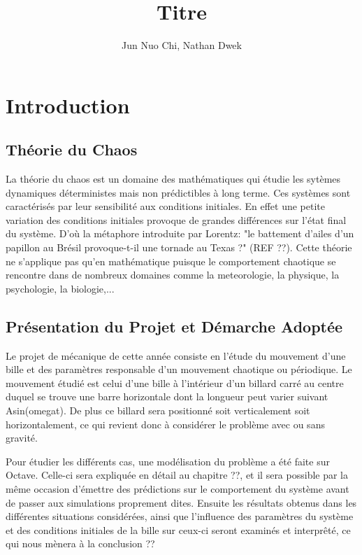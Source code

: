 \documentclass[a4paper]{report}
\title{Titre}
\author{Jun Nuo Chi, Nathan Dwek}
\begin{document}
\maketitle
\tableofcontents
\begin{abstract}

\end{abstract}

\chapter{Introduction}

\section{Théorie du Chaos}
La théorie du chaos est un domaine des mathématiques qui étudie les sytèmes dynamiques déterministes mais non prédictibles à long terme. Ces systèmes sont caractérisés par leur sensibilité aux conditions initiales. En effet une petite variation des conditions initiales provoque de grandes différences sur l'état final du système. D'où la métaphore introduite par Lorentz: "le battement d'ailes d'un papillon au Brésil provoque-t-il une tornade au Texas ?" (REF ??). Cette théorie ne s'applique pas qu'en mathématique puisque le comportement chaotique se rencontre dans de nombreux domaines comme la meteorologie, la physique, la psychologie, la biologie,...

\section{Présentation du Projet et Démarche Adoptée}
Le projet de mécanique de cette année consiste en l'étude du mouvement d'une bille et des paramètres responsable d'un mouvement chaotique ou périodique. Le mouvement étudié est celui d'une bille à l'intérieur d'un billard carré  au centre duquel se  trouve une barre horizontale dont la longueur peut varier suivant Asin(omegat). De plus ce billard sera positionné soit verticalement soit horizontalement, ce qui revient donc à considérer le problème avec ou sans gravité.

Pour étudier les différents cas, une modélisation du problème a été faite sur Octave.  Celle-ci sera expliquée en détail au chapitre ??, et il sera possible par la même occasion d'émettre des prédictions sur le comportement du système avant de passer aux simulations proprement dites. Ensuite les résultats obtenus dans les différentes situations considérées, ainsi que l'influence des paramètres du système et des conditions initiales de la bille sur ceux-ci seront examinés et interprêté, ce qui nous mènera à la conclusion ??
\end{document}
